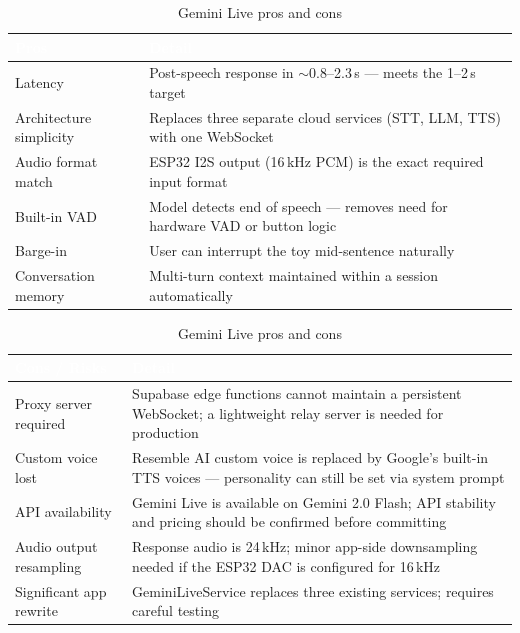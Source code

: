 \documentclass[12pt,a4paper]{article}
\begin{document}
\begin{table}[h!]
\centering
\renewcommand{\arraystretch}{1.3}
\begin{tabularx}{\linewidth}{|l|X|}
\hline
\rowcolor{primary}
\textcolor{white}{\textbf{Pros}} & \textcolor{white}{\textbf{Detail}} \\
\hline
Latency & Post-speech response in $\sim$0.8--2.3\,s — meets the 1--2\,s target \\
\hline
\rowcolor{rowalt}
Architecture simplicity & Replaces three separate cloud services (STT, LLM, TTS) with one WebSocket \\
\hline
Audio format match & ESP32 I2S output (16\,kHz PCM) is the exact required input format \\
\hline
\rowcolor{rowalt}
Built-in VAD & Model detects end of speech — removes need for hardware VAD or button logic \\
\hline
Barge-in & User can interrupt the toy mid-sentence naturally \\
\hline
\rowcolor{rowalt}
Conversation memory & Multi-turn context maintained within a session automatically \\
\hline
\end{tabularx}

\vspace{6pt}

\begin{tabularx}{\linewidth}{|l|X|}
\hline
\rowcolor{warning}
\textcolor{white}{\textbf{Cons / Risks}} & \textcolor{white}{\textbf{Detail}} \\
\hline
Proxy server required & Supabase edge functions cannot maintain a persistent WebSocket; a lightweight relay server is needed for production \\
\hline
\rowcolor{rowalt}
Custom voice lost & Resemble AI custom voice is replaced by Google's built-in TTS voices — personality can still be set via system prompt \\
\hline
API availability & Gemini Live is available on Gemini 2.0 Flash; API stability and pricing should be confirmed before committing \\
\hline
\rowcolor{rowalt}
Audio output resampling & Response audio is 24\,kHz; minor app-side downsampling needed if the ESP32 DAC is configured for 16\,kHz \\
\hline
Significant app rewrite & GeminiLiveService replaces three existing services; requires careful testing \\
\hline
\end{tabularx}
\caption{Gemini Live pros and cons}
\end{table}
\end{document}
